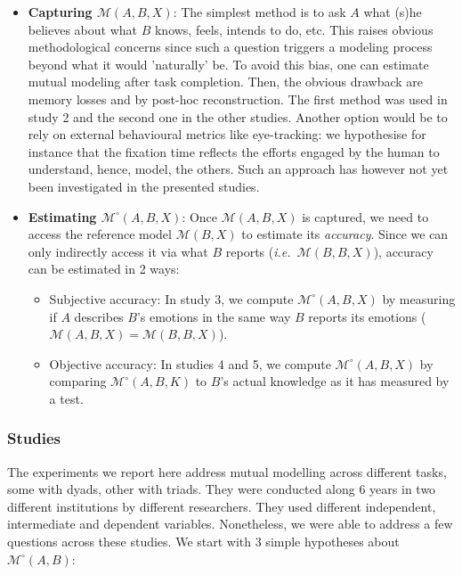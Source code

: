 \documentclass[twocolumn]{article}
\newcommand{\ie}{{\textit{i.e.\ }}}
\newcommand{\M}[3]{{\mathcal{M}(#1, #2, #3)}}
\newcommand{\model}[3]{{$\mathcal{M}(#1, #2, #3)$}}
\newcommand{\refmodel}[2]{{$\mathcal{M}(#1, #2)$}}
\newcommand{\Model}[3]{{$\mathcal{M}^{\circ}(#1, #2, #3)$}}
\begin{document}
\begin{itemize}
    \item {\bf Capturing \model{A}{B}{X}}: The simplest method is to ask $A$ what (s)he
        believes about what $B$ knows, feels, intends to do, etc. This raises
        obvious methodological concerns since such a question triggers a
        modeling process beyond what it would 'naturally' be. To avoid this
        bias, one can estimate mutual modeling after task completion. Then, the
        obvious drawback are memory losses and by post-hoc reconstruction.
        The first method was used in study 2 and the
        second one in the other studies. Another option would be to rely on external behavioural metrics like
        eye-tracking: we hypothesise for instance that the fixation time
        reflects the efforts engaged by the human to understand, hence, model,
        the others. Such an approach has however not yet been investigated in the presented studies.

    \item {\bf Estimating \Model{A}{B}{X}}: Once \model{A}{B}{X} is captured, we
        need to access the reference model \refmodel{B}{X} to estimate its
        \emph{accuracy}. Since we can only indirectly access it via what $B$
        reports (\ie \model{B}{B}{X}), accuracy can be estimated in 2 ways:

        \begin{itemize}

            \item Subjective accuracy: In study 3, we compute
                \Model{A}{B}{X} by measuring if $A$ describes
                $B$'s emotions in the same way $B$ reports its emotions 
                ($\M{A}{B}{X} = \M{B}{B}{X}$).

            \item Objective accuracy: In studies 4 and 5, we compute
                \Model{A}{B}{X} by comparing \Model{A}{B}{K} to $B$'s
                actual knowledge as it has measured by a test.

        \end{itemize}

\end{itemize}


\subsubsection{Studies}

The experiments we report here address mutual modelling across different tasks, some with
dyads, other with triads. They were conducted along 6 years in two different
institutions by different researchers. They used different independent,
intermediate and dependent variables. Nonetheless, we were able to address a few
questions across these studies. We start with 3 simple hypotheses about
$\mathcal{M}^{\circ}(A,B)$:
\end{document}
